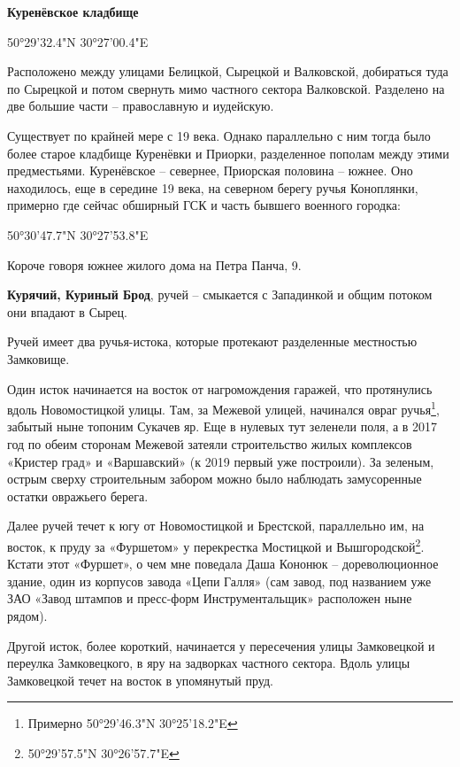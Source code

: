 \textbf{Куренёвское кладбище} 

50°29'32.4"N 30°27'00.4"E

Расположено между улицами Белицкой, Сырецкой и Валковской, добираться туда по Сырецкой и потом свернуть мимо частного сектора Валковской. Разделено на две большие части – православную и иудейскую. 

Существует по крайней мере с 19 века. Однако параллельно с ним тогда было более старое кладбище Куренёвки и Приорки, разделенное пополам между этими предместьями. Куренёвское – севернее, Приорская половина – южнее. Оно находилось, еще в середине 19 века, на северном берегу ручья Коноплянки, примерно где сейчас обширный ГСК и часть бывшего военного городка:

50°30'47.7"N 30°27'53.8"E

Короче говоря южнее жилого дома на Петра Панча, 9.\\

\medskip


\textbf{Курячий, Куриный Брод}, ручей – смыкается с Западинкой и общим потоком они впадают в Сырец.

Ручей имеет два ручья-истока, которые протекают разделенные местностью Замковище. 

Один исток начинается на восток от нагромождения гаражей, что протянулись вдоль Новомостицкой улицы. Там, за Межевой улицей,  начинался овраг ручья\footnote{Примерно 50°29'46.3"N 30°25'18.2"E}, забытый ныне топоним Сукачев яр. Еще в нулевых тут зеленели поля, а в 2017 год по обеим сторонам Межевой затеяли строительство жилых комплексов «Кристер град» и «Варшавский» (к 2019 первый уже построили). За зеленым, острым сверху строительным забором можно было наблюдать замусоренные остатки овражьего берега.

Далее ручей течет к югу от Новомостицкой и Брестской, параллельно им, на восток, к пруду за «Фуршетом» у перекрестка Мостицкой и Вышгородской\footnote{50°29'57.5"N 30°26'57.7"E}. Кстати этот «Фуршет», о чем мне поведала Даша Кононюк – дореволюционное здание, один из корпусов завода «Цепи Галля» (сам завод, под названием уже ЗАО «Завод штампов и пресс-форм Инструментальщик»  расположен ныне рядом).


Другой исток, более короткий, начинается у пересечения улицы Замковецкой и переулка Замковецкого, в яру на задворках частного сектора. Вдоль улицы Замковецкой течет на восток в упомянутый пруд. 

